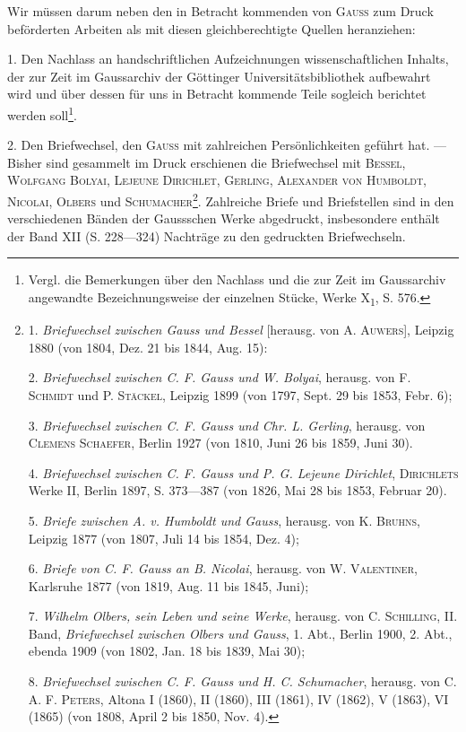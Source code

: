 \clearpage{}
Wir müssen darum neben den in Betracht kommenden von \textsc{Gauss} zum
Druck beförderten Arbeiten als mit diesen gleichberechtigte Quellen heranziehen:

1. Den Nachlass an handschriftlichen Aufzeichnungen wissenschaftlichen
Inhalts, der zur Zeit im Gaussarchiv der Göttinger Universitätsbibliothek aufbewahrt
wird und über dessen für uns in Betracht kommende Teile sogleich
berichtet werden soll\footnote{Vergl. die Bemerkungen über den Nachlass und die zur Zeit im Gaussarchiv angewandte Bezeichnungsweise der einzelnen Stücke, Werke X\textsubscript{1}, S. 576.}.

2. Den Briefwechsel, den \textsc{Gauss} mit zahlreichen Persönlichkeiten geführt
hat. — Bisher sind gesammelt im Druck erschienen die Briefwechsel mit
\textsc{Bessel}, \textsc{Wolfgang Bolyai}, \textsc{Lejeune Dirichlet}, \textsc{Gerling}, \textsc{Alexander von Humboldt},
\textsc{Nicolai}, \textsc{Olbers} und \textsc{Schumacher}\footnote{1. \textit{Briefwechsel zwischen Gauss und Bessel} [herausg. von A. \textsc{Auwers}], Leipzig 1880 (von 1804, Dez. 21 bis 1844, Aug. 15):
\par 2. \textit{Briefwechsel zwischen C. F. Gauss und W. Bolyai}, herausg. von F. \textsc{Schmidt} und P. \textsc{Stäckel}, Leipzig 1899 (von 1797, Sept. 29 bis 1853, Febr. 6);
\par 3. \textit{Briefwechsel zwischen C. F. Gauss und Chr. L. Gerling}, herausg. von \textsc{Clemens Schaefer}, Berlin 1927 (von 1810, Juni 26 bis 1859, Juni 30).
\par 4. \textit{Briefwechsel zwischen C. F. Gauss und P. G. Lejeune Dirichlet}, \textsc{Dirichlets} Werke II, Berlin 1897, S. 373—387 (von 1826, Mai 28 bis 1853, Februar 20).
\par 5. \textit{Briefe zwischen A. v. Humboldt und Gauss}, herausg. von K. \textsc{Bruhns}, Leipzig 1877 (von 1807, Juli 14 bis 1854, Dez. 4);
\par 6. \textit{Briefe von C. F. Gauss an B. Nicolai}, herausg. von W. \textsc{Valentiner}, Karlsruhe 1877 (von 1819, Aug. 11 bis 1845, Juni);
\par 7. \textit{Wilhelm Olbers, sein Leben und seine Werke}, herausg. von C. \textsc{Schilling}, II. Band, \textit{Briefwechsel zwischen Olbers und Gauss}, 1. Abt., Berlin 1900, 2. Abt., ebenda 1909 (von 1802, Jan. 18 bis 1839, Mai 30);
\par 8. \textit{Briefwechsel zwischen C. F. Gauss und H. C. Schumacher}, herausg. von C. A. F. \textsc{Peters}, Altona I (1860), II (1860), III (1861), IV (1862), V (1863), VI (1865) (von 1808, April 2 bis 1850, Nov. 4).}. Zahlreiche Briefe und Briefstellen
sind in den verschiedenen Bänden der Gaussschen Werke abgedruckt, insbesondere
enthält der Band XII (S. 228—324) Nachträge zu den gedruckten
Briefwechseln.

